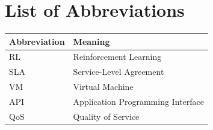 \chapter*{List of Abbreviations}
\begin{center}
\begin{tabularx}{0.7\textwidth}{@{}l X@{}}
\toprule
\textbf{Abbreviation} & \textbf{Meaning} \\
\midrule
RL  & Reinforcement Learning \\
SLA & Service-Level Agreement \\
VM  & Virtual Machine \\
API & Application Programming Interface \\
QoS & Quality of Service \\
\bottomrule
\end{tabularx}
\end{center}

